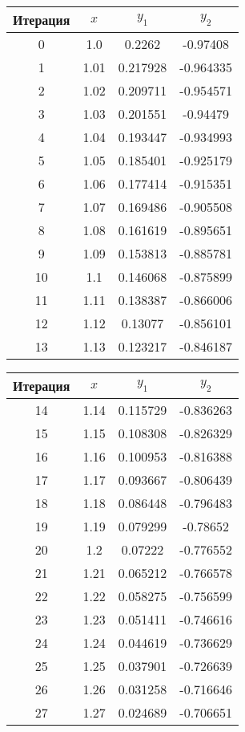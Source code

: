 \begin{center}
	\footnotesize
	\begin{tabular}{|c|c|c|c|}
		\hline
		Итерация & $ x $ & $ y_{1} $ & $ y_{2} $\\
		\hline
		0 & 1.0 & 0.2262 & -0.97408 \\
		\hline
		1 & 1.01 & 0.217928 & -0.964335 \\
		\hline
		2 & 1.02 & 0.209711 & -0.954571 \\
		\hline
		3 & 1.03 & 0.201551 & -0.94479 \\
		\hline
		4 & 1.04 & 0.193447 & -0.934993 \\
		\hline
		5 & 1.05 & 0.185401 & -0.925179 \\
		\hline
		6 & 1.06 & 0.177414 & -0.915351 \\
		\hline
		7 & 1.07 & 0.169486 & -0.905508 \\
		\hline
		8 & 1.08 & 0.161619 & -0.895651 \\
		\hline
		9 & 1.09 & 0.153813 & -0.885781 \\
		\hline
		10 & 1.1 & 0.146068 & -0.875899 \\
		\hline
		11 & 1.11 & 0.138387 & -0.866006 \\
		\hline
		12 & 1.12 & 0.13077 & -0.856101 \\
		\hline
		13 & 1.13 & 0.123217 & -0.846187 \\
		\hline
	\end{tabular}
	\begin{tabular}{|c|c|c|c|}
		\hline
		Итерация & $ x $ & $ y_{1} $ & $ y_{2} $\\
		\hline
		14 & 1.14 & 0.115729 & -0.836263 \\
     	\hline
		15 & 1.15 & 0.108308 & -0.826329 \\
		\hline
		16 & 1.16 & 0.100953 & -0.816388 \\
		\hline
		17 & 1.17 & 0.093667 & -0.806439 \\
		\hline
		18 & 1.18 & 0.086448 & -0.796483 \\
		\hline
		19 & 1.19 & 0.079299 & -0.78652 \\
		\hline
		20 & 1.2 & 0.07222 & -0.776552 \\
		\hline
		21 & 1.21 & 0.065212 & -0.766578 \\
		\hline
		22 & 1.22 & 0.058275 & -0.756599 \\
		\hline
		23 & 1.23 & 0.051411 & -0.746616 \\
		\hline
		24 & 1.24 & 0.044619 & -0.736629 \\
		\hline
		25 & 1.25 & 0.037901 & -0.726639 \\
		\hline
		26 & 1.26 & 0.031258 & -0.716646 \\
		\hline
		27 & 1.27 & 0.024689 & -0.706651 \\
		\hline
		

\end{tabular}
\end{center}
